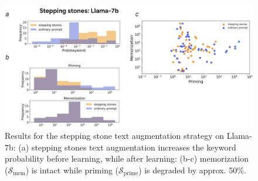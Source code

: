 \documentclass[11pt, a4paper, logo, copyright]{googledeepmind}
\theoremstyle{plain}
\theoremstyle{definition}
\theoremstyle{remark}
\begin{document}
\begin{figure}[h]
\vspace{0mm}
    \centering \includegraphics[scale=.37,clip]{figures/stones_llama.png}
    \vspace{-1mm}
    \caption{Results for the stepping stone text augmentation strategy on Llama-7b: (a) stepping stones text augmentation increases the keyword probability before learning, while after learning: (b-c) memorization ($\mathcal{S}_\text{mem}$) is intact while priming ($\mathcal{S}_\text{prime}$) is degraded by approx. 50\%.} \label{fig:stones_llama}
  \vspace{-0mm}
\end{figure}
\end{document}
